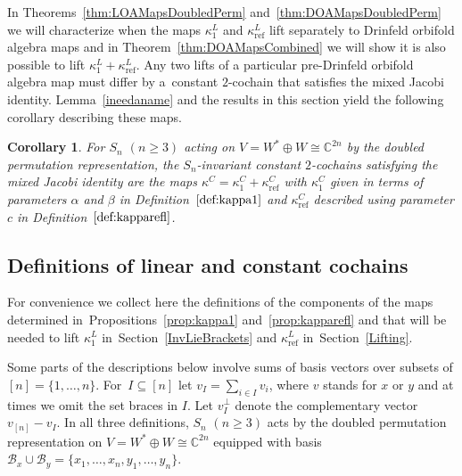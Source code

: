 \documentclass[10pt,a4paper]{amsart}
\numberwithin{equation}{section}
\newtheorem{Corollary}[Theorem]{Corollary}
\DeclareMathOperator{\refl}{ref}
\begin{document}
In Theorems~\ref{thm:LOAMapsDoubledPerm} and~\ref{thm:DOAMapsDoubledPerm}
we will characterize when the maps $\kappa^L_1$ and $\kappa^L_{\refl}$ lift separately
to Drinfeld orbifold algebra maps and in Theorem~\ref{thm:DOAMapsCombined} we will
show it is also possible to lift $\kappa^L_1+\kappa^L_{\refl}$. Any two lifts
of a particular pre-Drinfeld orbifold algebra map must differ by a~con\-stant
$2$-cochain that satisfies the mixed Jacobi identity. Lemma~\ref{ineedaname} and the results in this section yield the
following corollary describing these maps.

\begin{Corollary}\label{mixedJacobi}
For $S_n$ $(n\geq 3)$ acting on $V=W^* \oplus W \cong \mathbb{C}^{2n}$ by the
doubled permutation representation, the
$S_n$-invariant constant $2$-cochains satisfying the mixed Jacobi identity
are the maps $\kappa^C=\kappa^C_1+\kappa^C_{\refl}$ with $\kappa^C_1$ given in
terms of parameters $\alpha$ and $\beta$ in Definition~$\ref{def:kappa1}$
and $\kappa^C_{\refl}$ described using parameter $c$ in Definition~$\ref{def:kapparefl}$.
\end{Corollary}

\subsection{Definitions of linear and constant cochains}
For convenience we collect here the definitions of the components of the maps
determined in~Pro\-positions~\ref{prop:kappa1} and~\ref{prop:kapparefl} and that
will be needed to lift $\kappa^L_1$ in~Section~\ref{InvLieBrackets} and
$\kappa^L_{\refl}$ in~Section~\ref{Lifting}.

Some parts of the descriptions below involve sums of basis vectors
over subsets of $[n]=\{1,\dots,n\}$. For~$I \subseteq [n]$ let $v_I=\sum_{i \in I} v_i$,
where $v$ stands for $x$ or $y$ and at times we omit the set braces in $I$.
Let $v_I^\perp$ denote the complementary vector $v_{[n]}-v_I$.
In all three definitions, $S_n$ $(n \geq 3)$ acts by the doubled permutation representation on $V=W^* \oplus W \cong \mathbb{C}^{2n}$ equipped with basis $\mathcal{B}_x \cup \mathcal{B}_y=\{x_1,\dots,x_n,y_1,\dots,y_n\}$.
\end{document}
